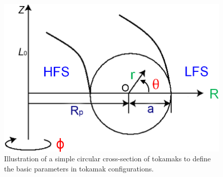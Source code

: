\begin{figure}[h]
\begin{centering}
\includegraphics[scale=0.4]{cross_section.png}
\par\end{centering}
\caption{Illustration of a simple circular cross-section of tokamaks to define the basic parameters in tokamak configurations.}
\label{fig:cross_section}
\end{figure}


